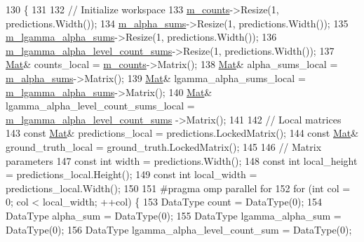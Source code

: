 \begin{DoxyCode}
130                                                                  \{
131 
132   \textcolor{comment}{// Initialize workspace}
133   \hyperlink{classlbann_1_1polya__negloglike_a441387814cd7deafb1f70c91926d3004}{m\_counts}->Resize(1, predictions.Width());
134   \hyperlink{classlbann_1_1polya__negloglike_aa77620f256de700ae8b3ca921957bcd1}{m\_alpha\_sums}->Resize(1, predictions.Width());
135   \hyperlink{classlbann_1_1polya__negloglike_a0aec768ffa50a8b716149d597699eddb}{m\_lgamma\_alpha\_sums}->Resize(1, predictions.Width());
136   \hyperlink{classlbann_1_1polya__negloglike_a78c9da1fb83c7b79a12cfbf30a4cb59e}{m\_lgamma\_alpha\_level\_count\_sums}->Resize(1, predictions.Width());
137   \hyperlink{base_8hpp_a68f11fdc31b62516cb310831bbe54d73}{Mat}& counts\_local = \hyperlink{classlbann_1_1polya__negloglike_a441387814cd7deafb1f70c91926d3004}{m\_counts}->Matrix();
138   \hyperlink{base_8hpp_a68f11fdc31b62516cb310831bbe54d73}{Mat}& alpha\_sums\_local = \hyperlink{classlbann_1_1polya__negloglike_aa77620f256de700ae8b3ca921957bcd1}{m\_alpha\_sums}->Matrix();
139   \hyperlink{base_8hpp_a68f11fdc31b62516cb310831bbe54d73}{Mat}& lgamma\_alpha\_sums\_local = \hyperlink{classlbann_1_1polya__negloglike_a0aec768ffa50a8b716149d597699eddb}{m\_lgamma\_alpha\_sums}->Matrix();
140   \hyperlink{base_8hpp_a68f11fdc31b62516cb310831bbe54d73}{Mat}& lgamma\_alpha\_level\_count\_sums\_local = \hyperlink{classlbann_1_1polya__negloglike_a78c9da1fb83c7b79a12cfbf30a4cb59e}{m\_lgamma\_alpha\_level\_count\_sums}
      ->Matrix();
141 
142   \textcolor{comment}{// Local matrices}
143   \textcolor{keyword}{const} \hyperlink{base_8hpp_a68f11fdc31b62516cb310831bbe54d73}{Mat}& predictions\_local = predictions.LockedMatrix();
144   \textcolor{keyword}{const} \hyperlink{base_8hpp_a68f11fdc31b62516cb310831bbe54d73}{Mat}& ground\_truth\_local = ground\_truth.LockedMatrix();
145   
146   \textcolor{comment}{// Matrix parameters}
147   \textcolor{keyword}{const} \textcolor{keywordtype}{int} width = predictions.Width();
148   \textcolor{keyword}{const} \textcolor{keywordtype}{int} local\_height = predictions\_local.Height();
149   \textcolor{keyword}{const} \textcolor{keywordtype}{int} local\_width = predictions\_local.Width();
150 
151 \textcolor{preprocessor}{  #pragma omp parallel for}
152   \textcolor{keywordflow}{for} (\textcolor{keywordtype}{int} col = 0; col < local\_width; ++col) \{
153     DataType count = DataType(0);
154     DataType alpha\_sum = DataType(0);
155     DataType lgamma\_alpha\_sum = DataType(0);
156     DataType lgamma\_alpha\_level\_count\_sum = DataType(0);

\end{DoxyCode}
